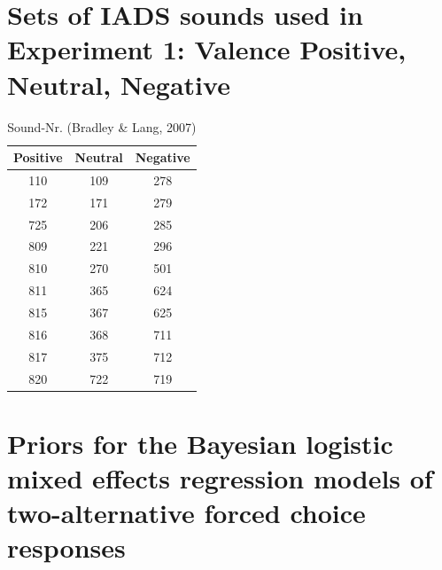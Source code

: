 \documentclass[
  ,doc,11pt, twoside,floatsintext]{apa6}
\begin{document}
\begin{appendix}
\section{Sets of IADS sounds used in Experiment 1: Valence Positive,
Neutral,
Negative}\label{sets-of-iads-sounds-used-in-experiment-1-valence-positive-neutral-negative}

\begin{table}[h]
\begin{center}
\begin{threeparttable}
\caption{\label{tab:appendix_table}Sound-Nr. (Bradley \& Lang, 2007)}
\begin{tabular}{ccc}
\toprule
Positive & \multicolumn{1}{c}{Neutral} & \multicolumn{1}{c}{Negative}\\
\midrule
110 & 109 & 278\\
172 & 171 & 279\\
725 & 206 & 285\\
809 & 221 & 296\\
810 & 270 & 501\\
811 & 365 & 624\\
815 & 367 & 625\\
816 & 368 & 711\\
817 & 375 & 712\\
820 & 722 & 719\\
\bottomrule
\end{tabular}
\end{threeparttable}
\end{center}
\end{table}

\clearpage

\section{Priors for the Bayesian logistic mixed effects regression
models of two-alternative forced choice
responses}\label{priors-for-the-bayesian-logistic-mixed-effects-regression-models-of-two-alternative-forced-choice-responses}


\end{appendix}
\end{document}
